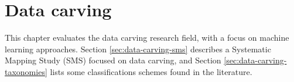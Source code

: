 \chapter{Data carving}
This chapter evaluates the data carving research field, with a focus on machine learning approaches. Section \ref{sec:data-carving-sms} describes a Systematic Mapping Study (SMS) focused on data carving, and Section \ref{sec:data-carving-taxonomies} lists some classifications schemes found in the literature.



% 
% 


